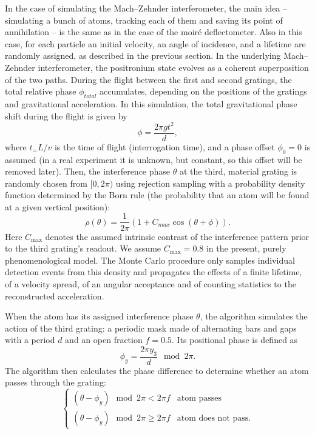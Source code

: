 \documentclass[12pt]{report}
\begin{document}
In the case of simulating the Mach--Zehnder interferometer, the main idea -- simulating a bunch of atoms, tracking each of them and saving its point of annihilation -- is the same as in the case of the moir\'e deflectometer. Also in this case, for each particle an initial velocity, an angle of incidence, and a lifetime are randomly assigned, as described in the previous section. 
In the underlying Mach--Zehnder interferometer, the positronium state evolves as a coherent superposition of the two paths.
During the flight between the first and second gratings, the total relative phase \(\phi_{total}\) accumulates, depending on the positions of the gratings and gravitational acceleration.
In this simulation, the total gravitational phase shift during the flight is given by 
\begin{equation}\phi=\frac{2\pi g t^2}{d},\end{equation} where \(t_=L/v\) is the time of flight (interrogation time), and a phase offset \(\phi_0=0\) is assumed (in a real experiment it is unknown, but constant, so this offset will be removed later). 
Then, the interference phase \(\theta\)  at the third, material grating is randomly chosen from \([0,2\pi)\) using rejection sampling with a probability density function determined by the Born rule (the probability that an atom will be found at a given vertical position): \begin{equation}\rho(\theta) = \frac{1}{2\pi}  \left(1 + C_{max} \cos(\theta + \phi)\right).\label{eq:interference-probability}\end{equation}
Here \(C_{\max}\) denotes the assumed intrinsic contrast of the interference pattern prior to the third grating’s readout. We assume \(C_{\max}=0.8\) in the present, purely phenomenological model. The Monte Carlo procedure only samples individual detection events from this density and propagates the effects of a finite lifetime, of a velocity spread, of an angular acceptance and of counting statistics to the reconstructed acceleration.

When the atom has its assigned interference phase \(\theta\), the algorithm simulates the action of the third grating: a periodic mask made of alternating bars and gaps with a period \(d\) and an open fraction \(f=0.5\). Its positional phase is defined as \begin{equation}\phi_y=\frac{2\pi y_3}{d}\mod2\pi.\end{equation} The algorithm then calculates the phase difference to determine whether an atom passes through the grating: \begin{equation}\begin{cases}
    (\theta-\phi_y)\mod 2\pi < 2\pi f & \text{atom passes}\\
    (\theta-\phi_y)\mod 2\pi \geq 2\pi f & \text{atom does not pass}.
\end{cases}\end{equation}
\end{document}

